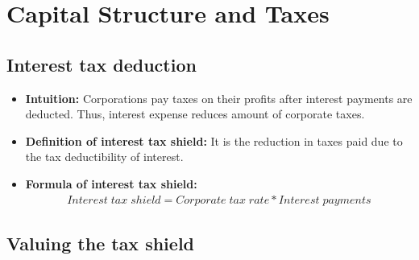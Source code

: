 \documentclass[ieeetran]{article}
\begin{document}
\section{Capital Structure and Taxes} %
\label{sec:capital_structure_and_taxes}

\subsection{Interest tax deduction} %
\label{sub:interest_tax_deduction}
\begin{itemize}
  \item \textbf{Intuition:} Corporations pay taxes on their profits after interest payments are deducted. Thus, interest expense reduces amount of corporate taxes.
\item \textbf{Definition of interest tax shield:} It is the reduction in taxes paid due to the tax deductibility of interest.
	\item \textbf{Formula of interest tax shield:}
		\large
		\begin{equation*}
		\boxed{
		\begin{aligned}
		Interest \; tax \; shield = Corporate \; tax \; rate * Interest \; payments
		\end{aligned}
		}
		\end{equation*}
		\normalsize
\end{itemize}

\subsection{Valuing the tax shield} %
\label{sub:valuing_the_tax_shield}
\end{document}
